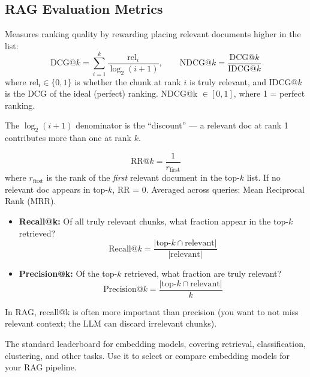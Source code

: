 \documentclass[11pt, a4paper]{article}
\begin{document}
\subsection{RAG Evaluation Metrics}

\begin{defbox}
Measures ranking quality by rewarding placing relevant documents higher in the list:
\[
\text{DCG@}k = \sum_{i=1}^{k} \frac{\text{rel}_i}{\log_2(i + 1)}, \qquad \text{NDCG@}k = \frac{\text{DCG@}k}{\text{IDCG@}k}
\]
where $\text{rel}_i \in \{0, 1\}$ is whether the chunk at rank $i$ is truly relevant, and $\text{IDCG@}k$ is the DCG of the ideal (perfect) ranking. NDCG@k $\in [0, 1]$, where 1 = perfect ranking.

The $\log_2(i+1)$ denominator is the ``discount'' --- a relevant doc at rank 1 contributes more than one at rank $k$.
\end{defbox}

\begin{defbox}
\[
\text{RR@}k = \frac{1}{r_{\text{first}}}
\]
where $r_{\text{first}}$ is the rank of the \emph{first} relevant document in the top-$k$ list. If no relevant doc appears in top-$k$, RR = 0. Averaged across queries: Mean Reciprocal Rank (MRR).
\end{defbox}

\begin{defbox}
\begin{itemize}[leftmargin=1.5em]
  \item \textbf{Recall@k:} Of all truly relevant chunks, what fraction appear in the top-$k$ retrieved?
  \[
  \text{Recall@}k = \frac{|\text{top-}k \cap \text{relevant}|}{|\text{relevant}|}
  \]
  \item \textbf{Precision@k:} Of the top-$k$ retrieved, what fraction are truly relevant?
  \[
  \text{Precision@}k = \frac{|\text{top-}k \cap \text{relevant}|}{k}
  \]
\end{itemize}
In RAG, recall@k is often more important than precision (you want to not miss relevant context; the LLM can discard irrelevant chunks).
\end{defbox}

\begin{notebox}
The standard leaderboard for embedding models, covering retrieval, classification, clustering, and other tasks. Use it to select or compare embedding models for your RAG pipeline.
\end{notebox}
\end{document}
